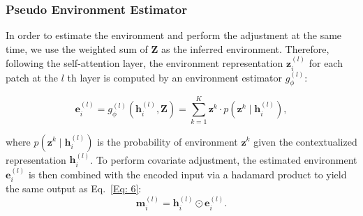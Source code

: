 



\subsubsection{Pseudo Environment Estimator}
\label{sec: env_estimate}

In order to estimate the environment and perform the adjustment at the same time, we use the weighted sum of $\mathbf{Z}$ as the inferred environment. Therefore, following the self-attention layer, the environment representation \( \mathbf{z}_i^{(l)} \) for each patch at the $l$ th layer is computed by an environment estimator $g_{\phi}^{(l)}$:

\[
\label{Eq: env_estimator}
\mathbf{e}_i^{(l)} = g_{\phi}^{(l)}(\mathbf{h}_i^{(l)}, \mathbf{Z}) = \sum_{k=1}^{K} \mathbf{z}^k \cdot p(\mathbf{z}^k \mid \mathbf{h}_i^{(l)}), \tag{7}
\]

where \( p(\mathbf{z}^k \mid \mathbf{h}_i^{(l)}) \) is the probability of environment \( \mathbf{z}^k \) given the contextualized representation \( \mathbf{h}_i^{(l)} \). To perform covariate adjustment, the estimated environment \( \mathbf{e}_i^{(l)} \) is then combined with the encoded input via a hadamard product to yield the same output as Eq.~\ref{Eq: 6}:
\[
\mathbf{m}_i^{(l)} = \mathbf{h}_i^{(l)} \odot \mathbf{e}_i^{(l)}. \tag{8}
\]


